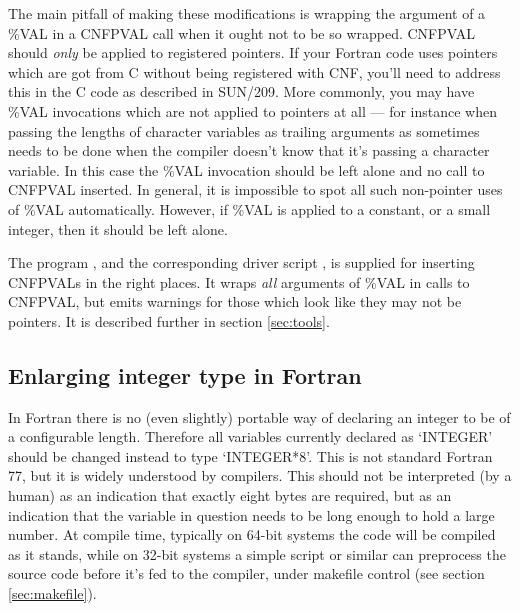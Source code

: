 \documentclass[twoside,11pt]{article}
\newcommand{\xref}[3]{#1}
\renewcommand{\_}{\texttt{\symbol{95}}}
\begin{document}
The main pitfall of making these modifications is
wrapping the argument of a \%VAL in a CNF\_PVAL call when it ought
not to be so wrapped.
CNF\_PVAL should {\em only\/} be applied to registered pointers.
If your Fortran code uses pointers which are got from C without 
being registered with CNF, you'll need to address this in the C code 
as described in \xref{SUN/209}{sun209}{pointers}.
More commonly, you may have \%VAL invocations which are not
applied to pointers at all --- for instance when passing 
the lengths of character variables as trailing arguments 
as sometimes needs to be done when the compiler doesn't know that
it's passing a character variable.  In this case the \%VAL 
invocation should be left alone and no call to CNF\_PVAL inserted.
In general, it is impossible to spot all such non-pointer uses
of \%VAL automatically.  However, if \%VAL is applied to a constant,
or a small integer, then it should be left alone.

The program , and the corresponding driver script 
\routine{do\_inscnf}, is supplied for inserting CNF\_PVALs
in the right places.  It wraps {\em all\/} arguments of \%VAL 
in calls to CNF\_PVAL, but emits warnings for those which look like
they may not be pointers.  It is described further in section 
\ref{sec:tools}.


\subsection{Enlarging integer type in Fortran\label{sec:fint}}


In Fortran there is no (even slightly) portable way of declaring
an integer to be of a configurable length. 
Therefore all variables currently declared as `INTEGER' 
should be changed instead to type `INTEGER*8'. 
This is not standard Fortran 77, but it is widely understood by compilers.
This should not be interpreted (by a human) as an indication that exactly
eight bytes are required, but as an indication that 
the variable in question needs to be
long enough to hold a large number.
At compile time, typically on 64-bit systems the code will be compiled
as it stands, while on 32-bit systems a simple  script or similar
can preprocess the source code before it's fed to the compiler,
under makefile control (see section \ref{sec:makefile}).
\end{document}
